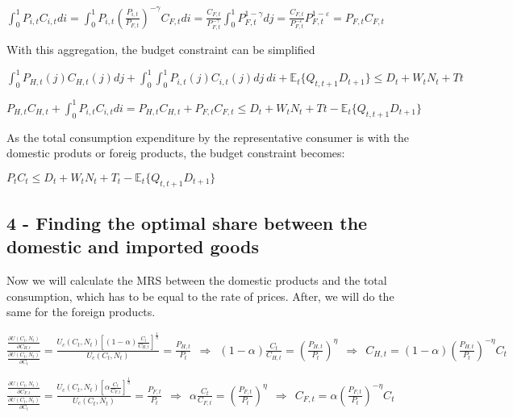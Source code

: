 \documentclass[
]{article}
\begin{document}
\(\displaystyle \int_0^1 P_{i,t}C_{i,t}di = \int_0^1P_{i,t}\left( \frac{P_{i,t}}{P_{F,t}}\right)^{-\gamma}C_{F,t}di = \frac{C_{F,t}}{P_{F,t}^{-\gamma}}\int_0^1 P_{F,t}^{1-\gamma}dj = \frac{C_{F,t}}{P_{F,t}^{-\varepsilon}}P_{F,t}^{1-\varepsilon} = P_{F,t}C_{F,t}\)

With this aggregation, the budget constraint can be simplified

\(\displaystyle \int_0^1 P_{H,t}(j)C_{H,t}(j)dj + \int_0^1\int_0^1 P_{i,t}(j)C_{i,t}(j)dj\ di + \mathbb{E}_t\{ Q_{t,t+1}D_{t+1}\} \leq D_t + W_tN_t + Tt\)

\(\displaystyle P_{H,t}C_{H,t} + \int_0^1P_{i,t}C_{i,t}di = P_{H,t}C_{H,t} + P_{F,t}C_{F,t} \leq D_t + W_tN_t + Tt - \mathbb{E}_t\{ Q_{t,t+1}D_{t+1}\}\)

As the total consumption expenditure by the representative consumer is
with the domestic produts or foreig products, the budget constraint
becomes:

\(\displaystyle P_t C_t \leq D_t + W_tN_t + T_t - \mathbb{E}_t\{ Q_{t,t+1}D_{t+1}\}\)

\hypertarget{finding-the-optimal-share-between-the-domestic-and-imported-goods}{%
\subsection{4 - Finding the optimal share between the domestic and
imported
goods}\label{finding-the-optimal-share-between-the-domestic-and-imported-goods}}

Now we will calculate the MRS between the domestic products and the
total consumption, which has to be equal to the rate of prices. After,
we will do the same for the foreign products.

\(\displaystyle \frac{\displaystyle \frac{\partial U(C_t,N_t)}{\displaystyle \partial C_{H,t}}}{\frac{\displaystyle \partial U(C_t,N_t)}{\displaystyle \partial C_t}} = \frac{\displaystyle U_c(C_t,N_t) \left[ (1-\alpha) \frac{C_t}{C_{H,t}} \right]^{\frac{1}{\eta}}}{\displaystyle U_c(C_t,N_t) } = \frac{P_{H,t}}{P_t} \ \ \Rightarrow \ \ (1-\alpha) \frac{C_t}{C_{H,t}} = \left( \frac{P_{H,t}}{P_t} \right)^\eta \ \ \Rightarrow \ \ C_{H,t} = (1-\alpha)\left( \frac{P_{H,t}}{P_t} \right)^{-\eta}C_t\)

\(\displaystyle \frac{\displaystyle \frac{\partial U(C_t,N_t)}{\displaystyle \partial C_{F,t}}}{\frac{\displaystyle \partial U(C_t,N_t)}{\displaystyle \partial C_t}} = \frac{\displaystyle U_c(C_t,N_t) \left[ \alpha \frac{C_t}{C_{F,t}} \right]^{\frac{1}{\eta}}}{\displaystyle U_c(C_t,N_t) } = \frac{P_{F,t}}{P_t} \ \ \Rightarrow \ \ \alpha \frac{C_t}{C_{F,t}} = \left( \frac{P_{F,t}}{P_t} \right)^\eta \ \ \Rightarrow \ \ C_{F,t} = \alpha \left( \frac{P_{F,t}}{P_t} \right)^{-\eta}C_t\)
\end{document}
